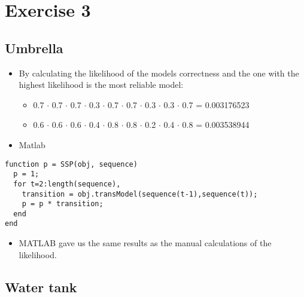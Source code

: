 \documentclass[colorlinks=true,linkcolor=blue]{article}
\begin{document}
\section{Exercise 3}
\label{sec-3}
\subsection{Umbrella}
\label{sec-3-1}
\begin{itemize}
\item By calculating the likelihood of the models correctness and the one with the highest likelihood is the most reliable model:
\begin{itemize}
\item 0.7 $\cdot$ 0.7 $\cdot$ 0.7 $\cdot$ 0.3 $\cdot$ 0.7 $\cdot$ 0.7 $\cdot$ 0.3 $\cdot$ 0.3 $\cdot$ 0.7 = 0.003176523
\item 0.6 $\cdot$ 0.6 $\cdot$ 0.6 $\cdot$ 0.4 $\cdot$ 0.8 $\cdot$ 0.8 $\cdot$ 0.2 $\cdot$ 0.4 $\cdot$ 0.8 = 0.003538944
\end{itemize}
\item Matlab
\end{itemize}
\begin{verbatim}
function p = SSP(obj, sequence)
  p = 1;
  for t=2:length(sequence),
    transition = obj.transModel(sequence(t-1),sequence(t));
    p = p * transition;                
  end
end
\end{verbatim}
\begin{itemize}
\item MATLAB gave us the same results as the manual calculations of the likelihood.
\end{itemize}

\subsection{Water tank}
\label{sec-3-2}

\end{document}
